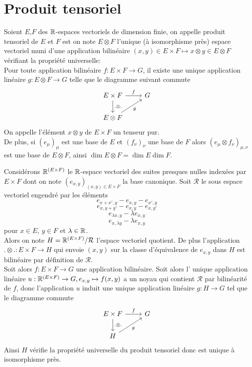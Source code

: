 \documentclass[12pt, a4paper]{book}
\begin{document}
\appendix


\section{Produit tensoriel}

\begin{defi}
Soient $E$,$F$ des $\mathbb{R}$-espaces vectoriels de dimension finie, on appelle produit tensoriel de $E$ et $F$ est on note $E\otimes F$ l'unique (à isomorphisme près) espace vectoriel muni d'une application bilinéaire $(x,y) \in E\times F \mapsto x\otimes y \in E\otimes F$ vérifiant la propriété universelle: \\
Pour toute application bilinéaire $f: E\times F \to G$, il existe une unique application linéaire $g: E\otimes F \to G$ telle que le diagramme suivant commute
$$\begin{tikzcd}
E \times F \arrow[r, "f"]  \arrow[d, ".\otimes ."] & G \\
E\otimes F \arrow[ru, "g"']& 
\end{tikzcd}$$
On appelle l'élément $x\otimes y$ de $E\times F$ un tenseur pur. \\

De plus, si $(e_\mu)_\mu$ est une base de $E$ et $(f_\nu)_\nu$ une base de $F$ alors $(e_\mu\otimes f_\nu)_{\mu,\nu}$ est une base de $E\otimes F$, ainsi $\dim E\otimes F = \dim E \dim F$.
\end{defi}
\begin{preu}
Considérons $\mathbb{R}^{(E\times F)}$ le $\mathbb{R}$-espace vectoriel des suites presques nulles indexées par $E\times F$ dont on note $(e_{x,y})_{(x,y)\in E\times F}$ la base canonique. Soit $\mathcal{R}$ le sous espace vectoriel engendré par les éléments 
$$e_{x+x', y}-e_{x,y}-e_{x',y}$$
$$e_{x, y+y'}-e_{x,y}-e_{x, y'}$$
$$e_{\lambda x, y}-\lambda e_{x, y}$$
$$e_{x, \lambda y}-\lambda e_{x, y}$$
pour $x\in E$, $y\in F$ et $\lambda \in \mathbb{R}$. \\

Alors on note $H = \mathbb{R}^{(E\times F)}/\mathcal{R}$ l'espace vectoriel quotient. De plus l'application $.\otimes . : E\times F \to H$ qui envoie $(x,y)$ sur la classe d'équivalence de $e_{x,y}$ dans $H$ est bilinéaire par définition de $\mathcal{R}$. \\

Soit alors $f:E\times F \to G$ une application bilinéaire. Soit alors l' unique application linéaire $u: \mathbb{R}^{(E\times F)} \to G, e_{x,y} \mapsto f(x,y)$ a un noyau qui contient $\mathcal{R}$ par bilinéarité de $f$, donc l'application $u$ induit une unique application linéaire $g : H\to G$ tel que le diagramme commute 
$$\begin{tikzcd}
E \times F \arrow[r, "f"]  \arrow[d, ".\otimes ."] & G \\
H \arrow[ru, "g"']& 
\end{tikzcd}$$
Ainsi $H$ vérifie la propriété universelle du produit tensoriel donc est unique à isomorphisme près.
\end{preu}
\end{document}
